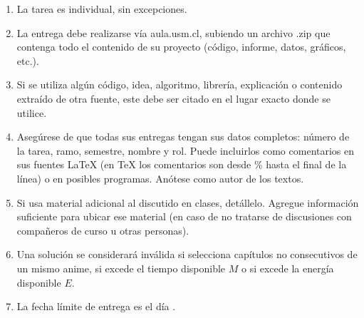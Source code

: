 \begin{enumerate}[(1)]
  \item La tarea es individual, sin excepciones.

  \item La entrega debe realizarse vía aula.usm.cl, subiendo un archivo .zip que contenga todo el contenido de su
proyecto (código, informe, datos, gráficos, etc.).

  \item Si se utiliza algún código, idea, algoritmo, librería, explicación o contenido extraído de otra fuente, este debe ser citado en el lugar exacto donde se utilice.

  \item Asegúrese de que todas sus entregas tengan sus datos completos: número de la tarea, ramo, semestre, nombre y rol. Puede incluirlos como comentarios en sus fuentes \LaTeX{} (en \TeX{} los comentarios son desde \% hasta el final de la línea) o en posibles programas. Anótese como autor de los textos.

  \item Si usa material adicional al discutido en clases, detállelo. Agregue información suficiente para ubicar ese
material (en caso de no tratarse de discusiones con compañeros de curso u otras personas).

  \item Una solución se considerará inválida si selecciona capítulos no consecutivos de un mismo anime, si excede el tiempo disponible $M$ o si excede la energía disponible $E$.

  \item La fecha límite de entrega es el día \tcm{\deadline}.
\end{enumerate}